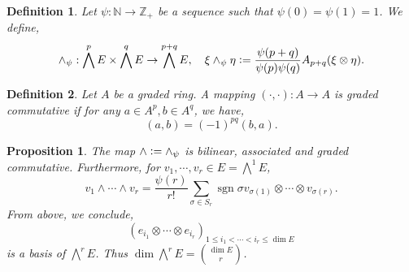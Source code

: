 \documentclass[8pt]{article}
\newtheorem{proposition}{Proposition}[section]
\newtheorem{definition}{Definition}[section]
\DeclareMathOperator{\sgn}{sgn}
\newcommand{\defeq}{\vcentcolon=}
\newcommand{\N}[0]{\mathbb{N}}
\newcommand{\Z}[0]{\mathbb{Z}}
\begin{document}
\begin{definition}
  Let $\psi:\N\to \Z_+$ be a sequence such that $\psi(0)=\psi(1) = 1$. We define,
  \begin{equation*}
    \wedge_\psi:\bigwedge^pE\times \bigwedge^q E \to\bigwedge^{p+q}E,\quad \xi\wedge_\psi \eta \defeq {\frac {\psi(p+q)} {\psi(p)\psi(q)}}A_{p+q}(\xi\otimes\eta).
  \end{equation*}
\end{definition}

\begin{definition}
  Let $A$ be a graded ring. A mapping $(\cdot,\cdot):A\to A$ is graded commutative if for any $a\in A^p,b\in A^q$, we have,
  \begin{equation*}
    (a,b) = (-1)^{pq}(b,a).
  \end{equation*} 
\end{definition}

\begin{proposition}
  The map $\wedge \defeq \wedge_\psi$ is bilinear, associated and graded commutative. Furthermore, for $v_1,\cdots,v_r\in E = \bigwedge^1E$, 
  \begin{equation*}
    v_1\wedge\cdots\wedge v_r = {\frac {\psi(r)} {r!}}\sum_{\sigma\in S_r}\sgn\sigma v_{\sigma(1)}\otimes\cdots\otimes v_{\sigma(r)}.
  \end{equation*}
  From above, we conclude,
  \begin{equation*}
    (e_{i_1}\otimes\cdots\otimes e_{i_r})_{1\leq i_1<\cdots<i_r\leq \dim E}
  \end{equation*}
  is a basis of $\bigwedge^rE$. Thus $\dim \bigwedge^r E = {\dim E\choose r}$.
\end{proposition}
\end{document}
